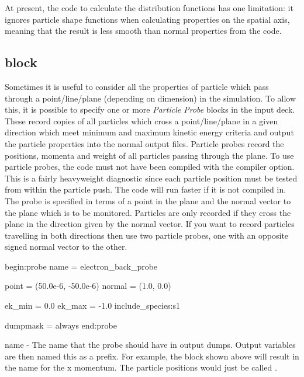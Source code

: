 At present, the code to calculate the distribution functions has one
limitation: it ignores particle shape functions when calculating properties
on the spatial axis, meaning that the result is less smooth than normal
properties from the code.


\subsection{\texorpdfstring
  { block}
  {           {probe} block}}
\label{sec:probe_block}
Sometimes it is useful to consider all the properties of particle which pass
through a point/line/plane (depending on dimension) in the simulation. To
allow this, it is possible to specify one or more {\it Particle Probe} blocks
in the input deck. These record copies of all particles which cross a
point/line/plane in a given direction which meet minimum and maximum kinetic
energy criteria and output the particle properties into the normal output
files. Particle probes record the positions, momenta and weight of all
particles passing through the plane. To use particle probes, the code must
not have been
compiled with the  compiler option. This is
a fairly heavyweight diagnostic since each particle position must be tested
from within the particle push. The code will run faster if it is not compiled
in.\\

The probe is specified in terms of a point in the plane and the normal
vector to the plane which is to be monitored. Particles are only recorded
if they cross the plane in the direction given by the normal vector.
If you want to record particles travelling in both directions then use two
particle probes, one with an opposite signed normal vector to the other.
{\samepage
\begin{boxverbatim}
begin:probe
   name = electron_back_probe

   point = (50.0e-6, -50.0e-6)
   normal = (1.0, 0.0)

   ek_min = 0.0
   ek_max = -1.0
   include_species:s1

   dumpmask = always
end:probe
\end{boxverbatim}
}

{\emphtext name} - The name that the probe should have in output dumps. Output
  variables are then named this as a prefix. For example, the block shown above
  will result in the name  for
  the x momentum. The particle positions would just be called
  .\\

